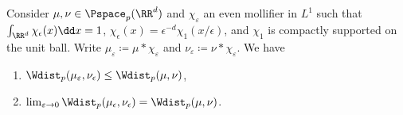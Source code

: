 \documentclass[oneside,reqno,letterpaper]{amsart}
\begin{document}
\begin{lemma}\label{prop:Wdist-convolution}
  Consider \(\mu, \nu \in \Pspace_p(\RR^d)\) and \(\chi_{\varepsilon}\) an even mollifier in \(L^1\) such that \(\int_{\RR^d} \chi_{\epsilon}(x) \dd x = 1\), \(\chi_{\epsilon}(x) = \epsilon^{-d} \chi_1(x / \epsilon)\), and \(\chi_1\) is compactly supported on the unit ball.
  Write \(\mu_{\varepsilon} \coloneqq \mu * \chi_{\varepsilon}\) and \(\nu_{\varepsilon} \coloneqq \nu * \chi_{\varepsilon}\).
  We have
  \begin{enumerate}[label=(\roman*)]
    \item \(\Wdist_p(\mu_{\varepsilon}, \nu_{\epsilon}) \leq \Wdist_p(\mu, \nu)\),
    \item \(\lim_{\varepsilon \to 0} \Wdist_p(\mu_{\epsilon}, \nu_{\epsilon}) = \Wdist_p(\mu, \nu)\).
  \end{enumerate}
\end{lemma}
\end{document}
